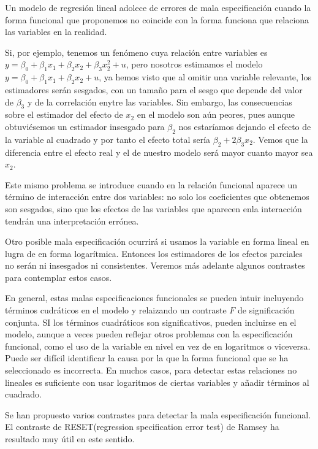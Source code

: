 
Un modelo de regresi\'on lineal adolece de errores de mala especificaci\'on cuando la forma funcional que proponemos no coincide con la forma funciona que relaciona las variables en la realidad.

Si, por ejemplo, tenemos un fen\'omeno cuya relaci\'on entre variables es $y=\beta_0+\beta_1x_1+\beta_2x_2+\beta_3x_2^2+u$, pero nosotros estimamos el modelo $y=\beta_0+\beta_1x_1+\beta_2x_2+u$, ya hemos visto que al omitir una variable relevante, los estimadores ser\'an sesgados, con un tama\~no para el sesgo que depende del valor de $\beta_3$ y de la correlaci\'on enytre las variables. Sin embargo, las consecuencias sobre el estimador del efecto de $x_2$ en el modelo son a\'un peores, pues aunque obtuvi\'esemos un estimador insesgado para $\beta_2$ nos estar\'iamos dejando el efecto de la variable al cuadrado y por tanto el efecto total ser\'ia $\beta_2+2\beta_3x_2$. Vemos que la diferencia entre el efecto real y el de nuestro modelo ser\'a mayor cuanto mayor sea $x_2$.

Este mismo problema se introduce cuando en la relaci\'on funcional aparece un t\'ermino de interacci\'on entre dos variables: no solo los coeficientes que obtenemos son sesgados, sino que los efectos de las variables que aparecen enla interacci\'on tendr\'an una interpretaci\'on err\'onea.

Otro posible mala especificaci\'on ocurrir\'a si usamos la variable en forma lineal en lugra de en forma logar\'itmica. Entonces los estimadores de los efectos parciales no ser\'an ni insesgados ni consistentes. Veremos m\'as adelante algunos contrastes para contemplar estos casos.

En general, estas malas especificaciones funcionales se pueden intuir incluyendo t\'erminos cudr\'aticos en el modelo y relaizando un contraste $F$ de significaci\'on conjunta. SI los t\'erminos cuadr\'aticos son significativos, pueden incluirse en el modelo, aunque a veces pueden reflejar otros problemas con la especificaci\'on funcional, como el uso de la variable en nivel en vez de en logaritmos o viceversa. Puede ser dif\'icil identificar la causa por la que la forma funcional que se ha seleccionado es incorrecta. En muchos casos, para detectar estas relaciones no lineales es suficiente con usar logaritmos de ciertas variables y a\~nadir t\'erminos al cuadrado.


Se han propuesto varios contrastes para detectar la mala especificaci\'on funcional. El contraste de RESET(regression specification error test) de Ramsey ha resultado muy \'util en este sentido.

